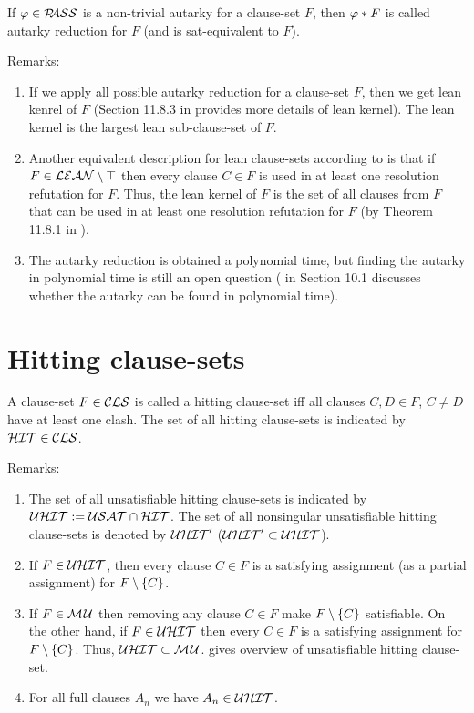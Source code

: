 \documentclass{report}
\begin{document}
\begin{defi}\label{def:autarky-redc}
If $\varphi \in \mathcal{P\hspace{-0.32em}ASS}$ is a non-trivial autarky for a clause-set $F$, then $\varphi *F$ is called autarky reduction for $F$ (and is sat-equivalent to $F$).
\end{defi} 
Remarks:
  \begin{enumerate}
  \item If we apply all possible autarky reduction for a clause-set $F$, then we get lean kenrel of $F$ (Section 11.8.3 in \cite{h25} provides more details of lean kernel). The lean kernel is the largest lean sub-clause-set of $F$.
  \item Another equivalent description for lean clause-sets according to \cite{h28} is that if $F \in \mathcal{LEAN} \setminus \top$ then every clause $C \in F$ is used in at least one resolution refutation for $F$. Thus, the lean kernel of $F$ is the set of all clauses from $F$ that can be used in at least one resolution refutation for $F$ (by Theorem 11.8.1 in \cite{h25}).
  \item The autarky reduction is obtained a polynomial time, but finding the autarky in polynomial time is still an open question (\cite{h9} in Section 10.1 discusses whether the autarky can be found in polynomial time).
  \end{enumerate}
\section{Hitting clause-sets}
\label{sec:hit}

\begin{defi}\label{def:hit-cls}
A clause-set $F \in \mathcal{CLS} $ is called a hitting clause-set iff all clauses $C,D \in F$, $C \not = D$ have at least one clash. The set of all hitting clause-sets is indicated by $\mathcal{HIT} \in \mathcal{CLS}$.
\end{defi}
Remarks:
  \begin{enumerate}
  \item The set of all unsatisfiable hitting clause-sets is indicated by $\mathcal{U}\mathcal{HIT} := \mathcal{USAT} \cap \mathcal{HIT}$. The set of all nonsingular unsatisfiable hitting clause-sets is denoted by $\mathcal{U}\mathcal{HIT}'$ ($\mathcal{U}\mathcal{HIT}' \subset \mathcal{U}\mathcal{HIT}$).
  \item If $F \in \mathcal{U}\mathcal{HIT}$, then every clause $C \in F$ is a satisfying assignment (as a partial assignment) for $F \setminus \{ C \}$.
  \item If $F \in \mathcal{M\hspace{0.8pt}U}$ then removing any clause $C \in F$ make $F \setminus \{ C \}$ satisfiable. On the other hand, if $F \in \mathcal{U}\mathcal{HIT}$ then every $C \in F$ is a satisfying assignment for $F \setminus \{ C \}$. Thus, $\mathcal{U}\mathcal{HIT} \subset \mathcal{M\hspace{0.8pt}U}$. \cite{h26} gives overview of unsatisfiable hitting clause-set.
  \item For all full clauses $A_n$ we have $A_n \in \mathcal{U}\mathcal{HIT}$.
  \end{enumerate}
\end{document}
